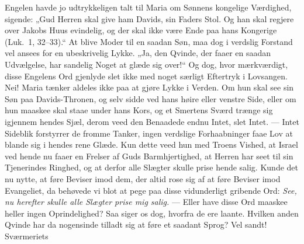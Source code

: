 \documentclass[12pt,a4paper]{book}
\begin{document}
Engelen havde jo udtrykkeligen talt til Maria om Sønnens kongelige Værdighed,
sigende: „Gud Herren skal give ham Davids, sin Faders Stol. Og han skal regjere
over Jakobs Huus evindelig, og der skal ikke være Ende paa hans Kongerige
(Luk.\ 1, 32--33).“ At blive Moder til en saadan Søn, maa dog i verdslig Forstand
vel ansees for en ubeskrivelig Lykke. „Ja, den Qvinde, der faaer en saadan
Udvælgelse, har sandelig Noget at glæde sig over!“ Og dog, hvor mærkværdigt,
disse Engelens Ord gjenlyde slet ikke med noget særligt Eftertryk i Lovsangen.
Nei! Maria tænker aldeles ikke paa at gjøre Lykke i Verden. Om hun skal see sin
Søn paa Davids-Thronen, og selv sidde ved hans høire eller venstre Side, eller om
hun maaskee skal staae under hans Kors, og et Smertens Sværd trænge sig igjennem
hendes Sjæl, derom veed den Benaadede endnu Intet, slet Intet. --- Intet
Sideblik forstyrrer de fromme Tanker, ingen verdslige Forhaabninger faae Lov at
blande sig i hendes rene Glæde. Kun dette veed hun
med Troens Vished, at Israel ved hende nu faaer en Frelser af Guds
Barmhjertighed, at Herren har seet til sin Tjenerindes Ringhed, og at derfor alle
Slægter skulle prise hende salig. Kunde det nu nytte, at føre Beviser imod dem,
der altid rose sig af at føre Beviser imod Evangeliet, da behøvede vi blot at
pege paa disse vidunderligt gribende Ord: \emph{See, nu herefter skulle alle
Slægter prise mig salig.} --- Eller have disse Ord maaskee heller ingen
Oprindelighed? Saa siger os dog, hvorfra de ere laante. Hvilken anden Qvinde har
da nogensinde tilladt sig at føre et saadant Sprog? Vel sandt! Sværmeriets
\end{document}
